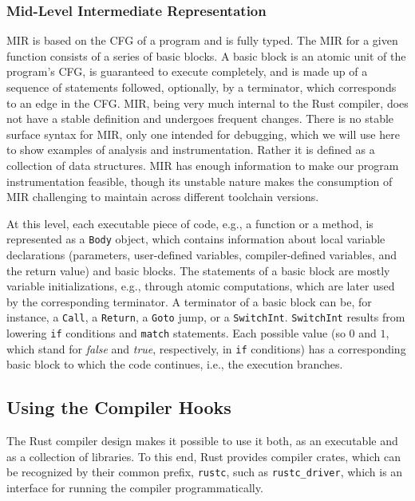 \documentclass{article}
\begin{document}
\subsubsection{Mid-Level Intermediate Representation} 
\ac{MIR} is based on the \ac{CFG} of a program and is fully typed. The \ac{MIR} for a given function consists of a series of basic blocks. A basic block is an atomic unit of the program's \ac{CFG}, is guaranteed to execute completely, and is made up of a sequence of statements followed, optionally, by a terminator, which corresponds to an edge in the \ac{CFG}. \ac{MIR}, being very much internal to the Rust compiler, does not have a stable definition and undergoes frequent changes. There is no stable surface syntax for \ac{MIR}, only one intended for debugging, which we will use here to show examples of analysis and instrumentation. Rather it is defined as a collection of data structures. \ac{MIR} has enough information to make our program instrumentation feasible, though its unstable nature makes the consumption of \ac{MIR} challenging to maintain across different toolchain versions. 

At this level, each executable piece of code, e.g., a function or a method, is represented as a \lstinline{Body} object, which contains information about local variable declarations (parameters, user-defined variables, compiler-defined variables, and the return value) and basic blocks. The statements of a basic block are mostly variable initializations, e.g., through atomic computations, which are later used by the corresponding terminator. A terminator of a basic block can be,  for instance, a \lstinline{Call}, a \lstinline{Return}, a \lstinline{Goto} jump, or a \lstinline{SwitchInt}. \lstinline{SwitchInt} results from lowering \lstinline{if} conditions and \lstinline{match} statements. Each possible value (so $0$ and $1$, which stand for \textit{false} and \textit{true}, respectively, in \lstinline{if} conditions) has a corresponding basic block to which the code continues, i.e., the execution branches. 

\subsection{Using the Compiler Hooks}
The Rust compiler design makes it possible to use it both, as an executable and as a collection of libraries. To this end, Rust provides compiler crates, which can be recognized by their common prefix, \lstinline{rustc}, such as \lstinline{rustc_driver}, which is an interface for running the compiler programmatically. 
\end{document}
